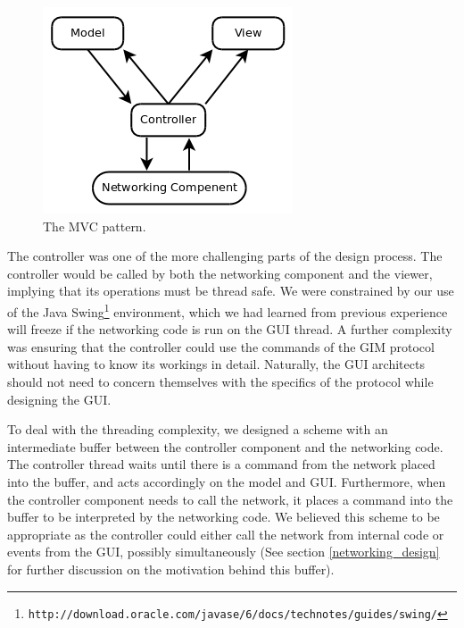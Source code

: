 \begin{figure}
    \begin{center}
        \includegraphics[scale=0.65]{Design/diagrams/mvc.png}
        \caption{The MVC pattern.}
        \label{mvc}
    \end{center}
\end{figure}

The controller was one of the more challenging parts of the design process. The controller would be called by both the networking component and the viewer, implying that its operations must be thread safe. We were constrained by our use of the Java Swing\footnote{\texttt{http://download.oracle.com/javase/6/docs/technotes/guides/swing/}} environment, which we had learned from previous experience will freeze if the networking code is run on the GUI thread. A further complexity was ensuring that the controller could use the commands of the GIM protocol without having to know its workings in detail. Naturally, the GUI architects should not need to concern themselves with the specifics of the protocol while designing the GUI.

To deal with the threading complexity, we designed a scheme with an intermediate buffer between the controller component and the networking code. The controller thread waits until there is a command from the network placed into the buffer, and acts accordingly on the model and GUI. Furthermore, when the controller component needs to call the network, it places a command into the buffer to be interpreted by the networking code. We believed this scheme to be appropriate as the controller could either call the network from internal code or events from the GUI, possibly simultaneously (See section \ref{networking_design} for further discussion on the motivation behind this buffer).

